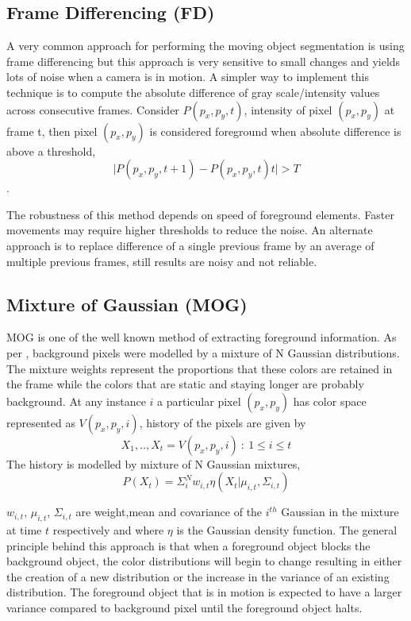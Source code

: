 \subsection{Frame Differencing (FD)}
A very common approach for performing the moving object segmentation is using frame differencing but this approach is very sensitive to small changes and yields lots of noise when a camera is in motion. A simpler way to implement this technique is to compute the absolute difference of gray scale/intensity values across consecutive frames. Consider $P(p_x,p_y,t)$, intensity of pixel $(p_x,p_y)$ at frame t, then pixel $(p_x,p_y)$ is considered foreground when absolute difference is above a threshold,$$\vert P(p_x,p_y,t+1) - P(p_x,p_y,t)t\vert > T$$.
\par The robustness of this method depends on speed of foreground elements. Faster movements may require higher thresholds to reduce the noise.  An alternate approach is to replace difference of a single previous frame  by an average of multiple previous frames, still results are noisy and not reliable.

\subsection{Mixture of Gaussian (MOG)}
MOG is one of the well known method of extracting foreground information. As per \cite{kaew}, background pixels were modelled by a mixture of N Gaussian distributions. The mixture weights represent the proportions that these colors are retained in the frame while the colors that are static and staying longer are probably background. At any instance $i$ a particular pixel $(p_x,p_y)$ has color space represented as $V(p_{x},p_{y},i)$, history of the pixels are given by 
$$X_{1},..,X_{t} = {V(p_{x},p_{y},i)~:~1\le i \le t }$$
The history is modelled by mixture of N Gaussian mixtures,
$$P(X_{t})=\Sigma_{i}^{N}w_{i,t}\eta(X_{t}|\mu_{i,t},\Sigma_{i,t})$$
\par $w_{i,t}$, $\mu_{i,t}$, $\Sigma_{i,t}$ are weight,mean and covariance of the $i^{th}$ Gaussian in the mixture at time $t$ respectively and where $\eta$ is the Gaussian density function. The general principle behind this approach is that when a foreground object blocks the background object, the color distributions will begin to change resulting in either the creation of a new distribution or the increase in the variance of an existing distribution. The foreground object that is in motion is expected to have a larger variance compared to background pixel until the foreground object halts.


